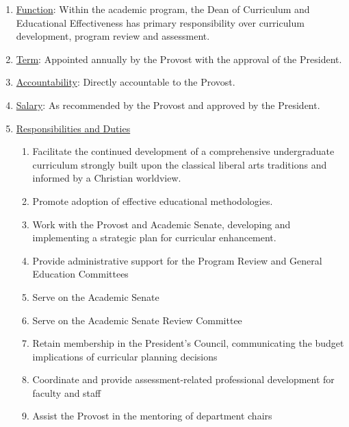 					\begin{enumerate}
						\item{\underline{Function}:  Within the academic program, the Dean of Curriculum and Educational Effectiveness has primary responsibility over curriculum development, program review and assessment.}
						\item{\underline{Term}:  Appointed annually by the Provost with the approval of the President.}
						\item{\underline{Accountability}:  Directly accountable to the Provost.}
						\item{\underline{Salary}:  As recommended by the Provost and approved by the President.}
						\item{\underline{Responsibilities and Duties}
							\begin{enumerate}
								\item{Facilitate the continued development of a comprehensive undergraduate curriculum strongly built upon the classical liberal arts traditions and informed by a Christian worldview.}
								\item{Promote adoption of effective educational methodologies.}
								\item{Work with the Provost and Academic Senate, developing and implementing a strategic plan for curricular enhancement.}
								\item{Provide administrative support for the Program Review and General Education Committees}
								\item{Serve on the Academic Senate}
								\item{Serve on the Academic Senate Review Committee}
								\item{ Retain membership in the President's Council, communicating the budget implications of curricular planning decisions}
								\item{ Coordinate and provide assessment-related professional development for faculty and staff}
								\item{ Assist the Provost in the mentoring of department chairs}
							\end{enumerate}
						}
					\end{enumerate}
